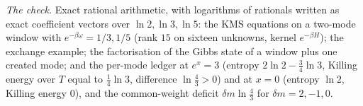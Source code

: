 \emph{The check.} Exact rational arithmetic, with logarithms of rationals written as exact coefficient vectors over $\ln 2, \ln 3, \ln 5$: the KMS equations on a two-mode window with $e^{-\beta\omega} = 1/3, 1/5$ (rank $15$ on sixteen unknowns, kernel $e^{-\beta H}$); the exchange example; the factorisation of the Gibbs state of a window plus one created mode; and the per-mode ledger at $e^{x} = 3$ (entropy $2\ln 2 - \tfrac34\ln 3$, Killing energy over $T$ equal to $\tfrac14\ln 3$, difference $\ln\tfrac43 > 0$) and at $x = 0$ (entropy $\ln 2$, Killing energy $0$), and the common-weight deficit $\delta m\ln\tfrac43$ for $\delta m = 2, -1, 0$.

